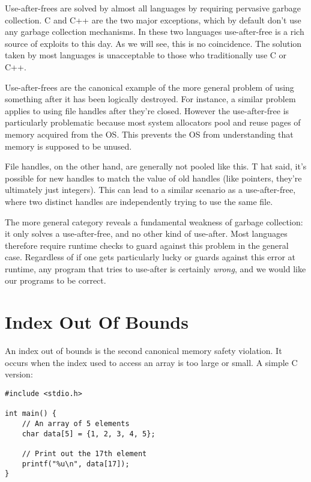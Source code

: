 Use-after-frees are solved by almost all languages by requiring
pervasive garbage collection. C and C++ are the two major exceptions, which
by default don't use any garbage collection mechanisms. In these two languages
use-after-free is a rich source of exploits to this day. As we will
see, this is no coincidence. The solution taken by most languages is
unacceptable to those who traditionally use C or C++.

Use-after-frees are the canonical example of the more general problem of
using something after it has been logically destroyed. For instance, a similar
problem applies to using file handles after they're closed. However the
use-after-free is particularly problematic because most system allocators
pool and reuse pages of memory acquired from the OS. This prevents the OS from
understanding that memory is supposed to be unused.

File handles, on the other hand, are generally not pooled like this. T
hat said, it's possible for new handles to match the value of old handles
(like pointers, they're ultimately just integers). This can lead to a similar
scenario as a use-after-free, where two distinct handles are independently
trying to use the same file.

The more general category reveals a fundamental weakness of garbage collection:
it only solves a use-after-free, and no other kind of use-after. Most languages
therefore require runtime checks to guard against this problem in the general
case. Regardless of if one gets particularly lucky or guards against this error
at runtime, any program that tries to use-after is certainly \emph{wrong}, and we would
like our programs to be correct.





\section{Index Out Of Bounds}

An index out of bounds is the second canonical memory safety violation. It
occurs when the index used to access an array is too large or small. A simple
C version:

\begin{verbatim}
#include <stdio.h>

int main() {
    // An array of 5 elements
    char data[5] = {1, 2, 3, 4, 5};

    // Print out the 17th element
    printf("%u\n", data[17]);
}
\end{verbatim}

